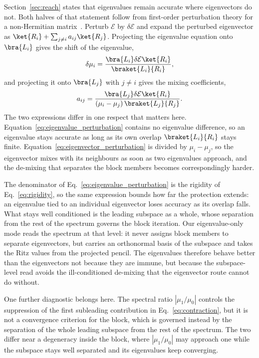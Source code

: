 Section~\ref{sec:reach} states that eigenvalues remain accurate where eigenvectors do not. Both halves of that statement follow from first-order perturbation theory for a non-Hermitian matrix~\cite{wilkinson1965}. Perturb $\mathcal{E}$ by $\delta\mathcal{E}$ and expand the perturbed eigenvector as $\ket{R_i}+\sum_{j\neq i}a_{ij}\ket{R_j}$. Projecting the eigenvalue equation onto $\bra{L_i}$ gives the shift of the eigenvalue,
\begin{equation}
  \delta\mu_i=
  \frac{\bra{L_i}\delta\mathcal{E}\ket{R_i}}
       {\braket{L_i}{R_i}},
  \label{eq:eigenvalue_perturbation}
\end{equation}
and projecting it onto $\bra{L_j}$ with $j\neq i$ gives the mixing coefficients,
\begin{equation}
  a_{ij}=
  \frac{\bra{L_j}\delta\mathcal{E}\ket{R_i}}
       {(\mu_i-\mu_j)\,\braket{L_j}{R_j}} .
  \label{eq:eigenvector_perturbation}
\end{equation}
The two expressions differ in one respect that matters here. Equation~\eqref{eq:eigenvalue_perturbation} contains no eigenvalue difference, so an eigenvalue stays accurate as long as its own overlap $\braket{L_i}{R_i}$ stays finite. Equation~\eqref{eq:eigenvector_perturbation} is divided by $\mu_i-\mu_j$, so the eigenvector mixes with its neighbours as soon as two eigenvalues approach, and the de-mixing that separates the block members becomes correspondingly harder.

The denominator of Eq.~\eqref{eq:eigenvalue_perturbation} is the rigidity of Eq.~\eqref{eq:rigidity}, so the same expression bounds how far the protection extends: an eigenvalue tied to an individual eigenvector loses accuracy as its overlap falls. What stays well conditioned is the leading subspace as a whole, whose separation from the rest of the spectrum governs the block iteration. Our eigenvalue-only mode reads the spectrum at that level: it never assigns block members to separate eigenvectors, but carries an orthonormal basis of the subspace and takes the Ritz values from the projected pencil. The eigenvalues therefore behave better than the eigenvectors not because they are immune, but because the subspace-level read avoids the ill-conditioned de-mixing that the eigenvector route cannot do without.

One further diagnostic belongs here. The spectral ratio $|\mu_1/\mu_0|$ controls the suppression of the first subleading contribution in Eq.~\eqref{eq:contraction}, but it is not a convergence criterion for the block, which is governed instead by the separation of the whole leading subspace from the rest of the spectrum. The two differ near a degeneracy inside the block, where $|\mu_1/\mu_0|$ may approach one while the subspace stays well separated and its eigenvalues keep converging.

